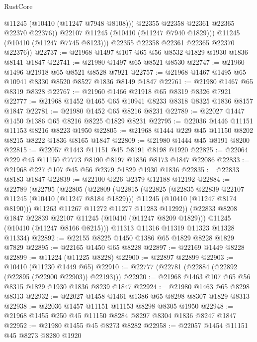 \begin{lexlean}{RustCore}
\begin{coremodule}
                  @11245
                  (@10410 (@11247 @7948 @8108)))
                @22355
                @22358
                @22361
                @22365
                @22370
                @22376))
            @22107
            @11245
            (@10410 (@11247 @7940 @1829)))
          @11245
          (@10410 (@11247 @7745 @8123)))
        @22355
        @22358
        @22361
        @22365
        @22370
        @22376))
@22737 := @21968 @1497 @107 @65 @56 @8532 @1829 @1930 @1836 @8141 @1847
@22741 := @21980 @1497 @65 @8521 @8530
@22747 := @21960 @1496 @21918 @65 @8521 @8528 @7921
@22757 := @21968 @1467 @1495 @65 @10941 @8330 @8520 @8527 @1836 @8149 @1847
@22761 := @21980 @1467 @65 @8319 @8328
@22767 := @21960 @1466 @21918 @65 @8319 @8326 @7921
@22777 := @21968 @1452 @1465 @65 @10941 @8233 @8318 @8325 @1836 @8157 @1847
@22781 := @21980 @1452 @65 @8216 @8231
@22789 := @22027 @1447 @1450 @1386 @65 @8216 @8225 @1829 @8231
@22795 := @22036 @1446 @11151 @11153 @8216 @8223 @1950
@22805 := @21968 @1444 @229 @45 @11150 @8202 @8215 @8222 @1836 @8165 @1847
@22809 := @21980 @1444 @45 @8191 @8200
@22815 := @22057 @1443 @11151 @45 @8191 @8198 @1920
@22825 := @22064 @229 @45 @11150 @7773 @8190 @8197 @1836 @8173 @1847 @22086
@22833 := @21968 @227 @107 @45 @56 @2379 @1829 @1930 @1836
@22835 := @22833 @8183 @1847
@22839 := @22100 @226 @2379 @12188 @12192
@22884 := @22789
    (@22795
      (@22805
        (@22809
          (@22815
            (@22825
              (@22835 @22839 @22107 @11245 (@10410 (@11247 @8184 @1829)))
              @11245
              (@10410 (@11247 @8174 @8190)))
            @11263
            @11267
            @11272
            @11277
            @11283
            @11292))
        (@22833 @8208 @1847 @22839 @22107 @11245 (@10410 (@11247 @8209 @1829)))
        @11245
        (@10410 (@11247 @8166 @8215)))
      @11313
      @11316
      @11319
      @11323
      @11328
      @11334)
@22892 := @22155 @8225 @1450 @1386 @65 @1829 @8228 @1829 @7829
@22895 := @22165 @1450 @65 @8228
@22897 := @22169 @1449 @8228
@22899 := @11224 (@11225 @8228)
@22900 := @22897 @22899
@22903 := @10410 (@11230 @1449 @65)
@22910 := @22777 (@22781 (@22884 (@22892 (@22895 (@22900 @22903)) @22193)))
@22920 := @21968 @1463 @107 @65 @56 @8315 @1829 @1930 @1836 @8239 @1847
@22924 := @21980 @1463 @65 @8298 @8313
@22932 := @22027 @1458 @1461 @1386 @65 @8298 @8307 @1829 @8313
@22938 := @22036 @1457 @11151 @11153 @8298 @8305 @1950
@22948 := @21968 @1455 @250 @45 @11150 @8284 @8297 @8304 @1836 @8247 @1847
@22952 := @21980 @1455 @45 @8273 @8282
@22958 := @22057 @1454 @11151 @45 @8273 @8280 @1920

\end{coremodule}
\end{lexlean}
